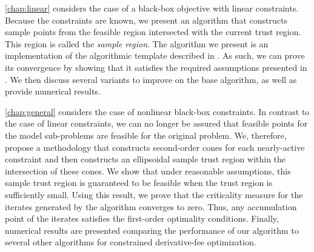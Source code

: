 % 
% 
% 

\cref{chap:linear} considers the case of a black-box objective with linear 
constraints.  
Because the constraints are known, we present an algorithm that constructs sample points from the feasible region intersected with the current trust region.
This region is called the {\em sample region}.
The algorithm we present is an implementation of the algorithmic template described in \cite{Conejo:2013:GCT:2620806.2621814}.
As such, we can prove its convergence by showing that it satisfies the required assumptions presented in \cite{Conejo:2013:GCT:2620806.2621814}.
We then discuss several variants to improve on the base algorithm, as well as provide numerical results.

\cref{chap:general} considers the case of nonlinear black-box constraints.
In contrast to the case of linear constraints, we can no longer be assured that feasible points for the model sub-problems are feasible for the original problem.
We, therefore, propose a methodology that constructs second-order cones for each nearly-active constraint and then constructs an ellipsoidal sample trust region within the intersection of these cones.
We show that under reasonable assumptions, this sample trust region is guaranteed to be feasible when the trust region is sufficiently small.
Using this result,  we prove that the criticality measure for the iterates generated by the algorithm converges to zero.
Thus,  any accumulation point of the iterates satisfies the first-order optimality conditions.
Finally, numerical results are presented comparing the performance of our algorithm to several other algorithms for constrained derivative-fee optimization.

